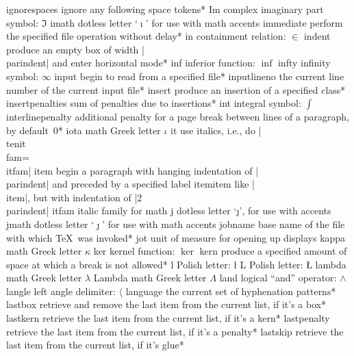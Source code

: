 \capcs ignorespaces {ignore any following space tokens}*{}
\capcs Im {complex imaginary part symbol: $\Im$}{}{}
\capcs imath {dotless letter `$\imath$' for use with math accents}{}{}
\capcs immediate {perform the specified file operation without delay}*{}
\capcs in {containment relation: $\in$}{}{}
\capcs indent {produce an empty box of width |\\parindent| and enter
   horizontal mode}*{}
\capcs inf {inferior function: $\inf$}{}{}
\capcs infty {infinity symbol: $\infty$}{}{}
\capcs input {begin to read from a specified file}*{}
\capcs inputlineno {the current line number of the current input file}*{}
\capcs insert {produce an insertion of a specified class}*{}
\capcs insertpenalties {sum of penalties due to insertions}*{}
\capcs int {integral symbol: $\int$}{}{}
\capcs interlinepenalty {additional penalty for a page break
   between lines of a paragraph, by default~0}*{}
\capcs iota {math Greek letter $\iota$}{}{}
\capcs it {use italics, i.e., do |\\tenit\\fam=\\itfam|}{}{}
\capcs item {begin a paragraph with hanging indentation of |\\parindent| 
   and preceded by a specified label}{}{}
\capcs itemitem {like |\\item|, but with indentation of |2\\parindent|}{}{}
\capcs itfam {italic family for math}{}{}
\capcs j {dotless letter `\j', for use with accents}{}{}
\capcs jmath {dotless letter `$\jmath$' for use with math accents}{}{}
\capcs jobname {base name of the file with which \TeX\ was invoked}*{}
\capcs jot {unit of measure for opening up displays}{}{}
\capcs kappa {math Greek letter $\kappa$}{}{}
\capcs ker {kernel function: $\ker$}{}{}
\capcs kern {produce a specified amount of space at which
   a break is not allowed}*{}
\capcs l {Polish letter: \l}{}{}
\capcs L {Polish letter: \L}{}{}
\capcs lambda {math Greek letter $\lambda$}{}{}
\capcs Lambda {math Greek letter $\Lambda$}{}{}
\capcs land {logical ``and'' operator: $\land$}{}{}
\capcs langle {left angle delimiter: $\langle$}{}{}
\capcs language {the current set of hyphenation patterns}*{}
\capcs lastbox {retrieve and remove the last item from the current list, if
   it's a box}*{}
\capcs lastkern {retrieve the last item from the current list, if it's a
   kern}*{}
\capcs lastpenalty {retrieve the last item from the current list, if it's a
   penalty}*{}
\capcs lastskip {retrieve the last item from the current list, if it's
   glue}*{}
